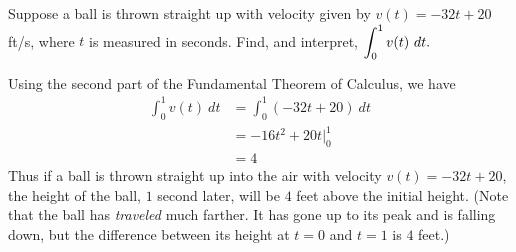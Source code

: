 \begin{example}
Suppose a ball is thrown straight up with velocity given by $v(t) = -32t+20$ ft/s, where $t$ is measured in seconds. Find, and interpret, $\displaystyle \int_0^1 v(t) \ dt.$

\solution Using the second part of the Fundamental Theorem of Calculus, we have 
\begin{align*}
\int_0^1 v(t)\ dt &= \int_0^1 (-32t+20)\ dt \\
			&= -16t^2 + 20t\Big|_0^1 \\
			&= 4
\end{align*}
Thus if a ball is thrown straight up into the air with velocity $v(t) = -32t+20$, the height of the ball, $1$ second later, will be $4$ feet above the initial height. (Note that the ball has \textit{traveled} much farther. It has gone up to its peak and is falling down, but the difference between its height at $t=0$ and $t=1$ is $4$ feet.)
\end{example}